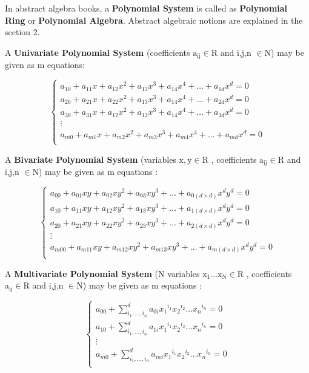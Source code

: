\documentclass[11pt]{article}
\begin{document}
In abstract algebra books,  a \textbf{Polynomial System} is called as \textbf{Polynomial Ring} or \textbf{Polynomial Algebra}. \cite{wolframPolynomial} Abstract algebraic notions are explained in the section 2.

A \textbf{Univariate Polynomial System}  (coefficients  $\mathrm{a_{ij} \in R}$  and i,j,n $\mathrm{\in N}$) may be given as m equations:

\begin{equation}
   \begin{cases}
    a_{10}+a_{11}x+a_{12}x^2+a_{13}x^3+a_{14}x^4+\ldots+a_{1d}x^d=0 \\
    a_{20}+a_{21}x+a_{22}x^2+a_{13}x^3+a_{14}x^4+\ldots+a_{2d}x^d=0 \\
    a_{30}+a_{31}x+a_{12}x^2+a_{13}x^3+a_{14}x^4+\ldots+a_{3d}x^d=0 \\
    \vdots \\
    a_{m0}+a_{m1}x+a_{m2}x^2+a_{m3}x^3+a_{m4}x^4+\ldots+a_{md}x^d=0 \\
  \end{cases}
\end{equation}


A \textbf{Bivariate Polynomial System}  (variables  $\mathrm{x,y \in R}$ ,  coefficients  $\mathrm{a_{ij} \in R}$  and i,j,n $\mathrm{\in N}$) may be given as m equations :

\begin{equation}
   \begin{cases}
    a_{00}+a_{01}xy+a_{02}xy^2+a_{03}xy^3+\ldots+a_{0(d \times d)}x^dy^d=0 \\
    a_{10}+a_{11}xy+a_{12}xy^2+a_{13}xy^3+\ldots+a_{1(d \times d)}x^dy^d=0 \\
    a_{20}+a_{21}xy+a_{22}xy^2+a_{23}xy^3+\ldots+a_{2(d \times d)}x^dy^d=0 \\
    \vdots \\
    a_{m00}+a_{m11}xy+a_{m12}xy^2+a_{m13}xy^3+\ldots+a_{m(d \times d)}x^dy^d=0 \\
  \end{cases}
\end{equation}


A \textbf{Multivariate Polynomial System}  (N variables  $\mathrm{x_1 \ldots x_N \in R}$ ,  coefficients  $\mathrm{a_{ij} \in R}$  and i,j,n $\mathrm{\in N}$) may be given as m equations :

\begin{equation}
   \begin{cases}
    a_{00}+\sum_{i_1,\ldots,i_n}^{d}{a_{0i}{x_1}^{i_1}{x_2}^{i_2} \ldots {x_n}^{i_n} }=0 \\
    a_{10}+\sum_{i_1,\ldots,i_n}^{d}{a_{1i}{x_1}^{i_1}{x_2}^{i_2} \ldots {x_n}^{i_n} }=0 \\
    \vdots \\
    a_{m0}+\sum_{i_1,\ldots,i_n}^{d}{a_{mi}{x_1}^{i_1}{x_2}^{i_2} \ldots {x_n}^{i_n} }=0 \\
  \end{cases}
\end{equation}
\end{document}
